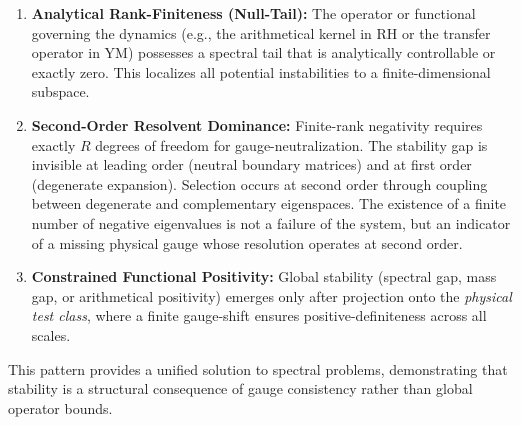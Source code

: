 \documentclass[12pt,a4paper]{article}
\theoremstyle{definition}
\theoremstyle{remark}
\begin{document}
\begin{enumerate}[label=\alph*)]
    \item \textbf{Analytical Rank-Finiteness (Null-Tail):} The operator or functional governing the dynamics (e.g., the arithmetical kernel in RH or the transfer operator in YM) possesses a spectral tail that is analytically controllable or exactly zero. This localizes all potential instabilities to a finite-dimensional subspace.
    \item \textbf{Second-Order Resolvent Dominance:} Finite-rank negativity requires exactly $R$ degrees of freedom for gauge-neutralization. The stability gap is invisible at leading order (neutral boundary matrices) and at first order (degenerate expansion). Selection occurs at second order through coupling between degenerate and complementary eigenspaces. The existence of a finite number of negative eigenvalues is not a failure of the system, but an indicator of a missing physical gauge whose resolution operates at second order.
    \item \textbf{Constrained Functional Positivity:} Global stability (spectral gap, mass gap, or arithmetical positivity) emerges only after projection onto the \emph{physical test class}, where a finite gauge-shift ensures positive-definiteness across all scales.
\end{enumerate}

This pattern provides a unified solution to spectral problems, demonstrating that stability is a structural consequence of gauge consistency rather than global operator bounds.
\end{document}
